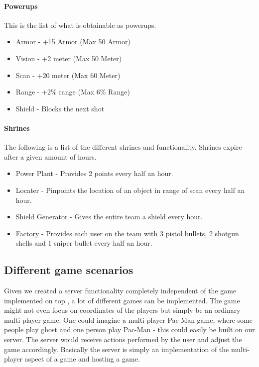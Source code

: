 \paragraph{Powerups}
This is the list of what is obtainable as powerups.
\begin{itemize}
\item Armor - +15 Armor (Max 50 Armor)
\item Vision - +2 meter (Max 50 Meter)
\item Scan - +20 meter (Max 60 Meter)
\item Range - +2\% range (Max 6\% Range)
\item Shield - Blocks the next shot
\end{itemize}

\paragraph{Shrines}
The following is a list of the different shrines and functionality. Shrines expire after a given amount of hours.
\begin{itemize}
\item Power Plant - Provides 2 points every half an hour.
\item Locater - Pinpoints the location of an object in range of scan every half an hour.
\item Shield Generator - Gives the entire team a shield every hour.
\item Factory - Provides each user on the team with 3 pistol bullets, 2 shotgun shells and 1 sniper bullet every half an hour.
\end{itemize}

\subsection{Different game scenarios}\label{subsec:game-scenarios}
Given we created a server functionality completely independent of the game implemented on top , a lot of different games can be implemented. The game might not even focus on coordinates of the players but simply be an ordinary multi-player game. One could imagine a multi-player Pac-Man game, where some people play ghost and one person play Pac-Man - this could easily be built on our server. The server would receive actions performed by the user and adjust the game accordingly.
Basically the server is simply an implementation of the multi-player aspect of a game and hosting a game. 


